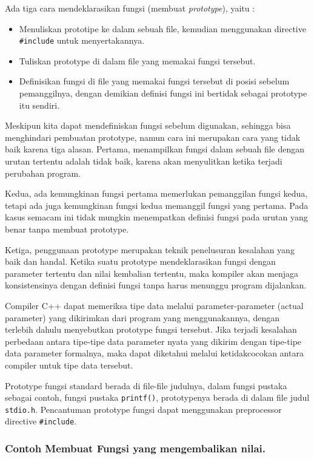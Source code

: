 Ada tiga cara mendeklarasikan fungsi (membuat \emph{prototype}), yaitu :

\begin{itemize}

\item
  Menuliskan prototipe ke dalam sebuah file, kemudian menggunakan
  directive \texttt{\#include} untuk menyertakannya.
\item
  Tuliskan prototype di dalam file yang memakai fungsi tersebut.
\item
  Definisikan fungsi di file yang memakai fungsi tersebut di posisi
  sebelum pemanggilnya, dengan demikian definisi fungsi ini bertidak
  sebagai prototype itu sendiri.
\end{itemize}

Meskipun kita dapat mendefiniskan fungsi sebelum digunakan, sehingga
bisa menghindari pembuatan prototype, namun cara ini merupakan cara yang
tidak baik karena tiga alasan. Pertama, menampilkan fungsi dalam sebuah
file dengan urutan tertentu adalah tidak baik, karena akan menyulitkan
ketika terjadi perubahan program.

Kedua, ada kemungkinan fungsi pertama memerlukan pemanggilan fungsi
kedua, tetapi ada juga kemungkinan fungsi kedua memanggil fungsi yang
pertama. Pada kasus semacam ini tidak mungkin menempatkan definisi
fungsi pada urutan yang benar tanpa membuat prototype.

Ketiga, penggunaan prototype merupakan teknik penelusuran kesalahan yang
baik dan handal. Ketika suatu prototype mendeklarasikan fungsi dengan
parameter tertentu dan nilai kembalian tertentu, maka kompiler akan
menjaga konsistensinya dengan definisi fungsi tanpa harus menunggu
program dijalankan.

Compiler C++ dapat memeriksa tipe data melalui parameter-parameter
(actual parameter) yang dikirimkan dari program yang menggunakannya,
dengan terlebih dahulu menyebutkan prototype fungsi tersebut. Jika
terjadi kesalahan perbedaan antara tipe-tipe data parameter nyata yang
dikirim dengan tipe-tipe data parameter formalnya, maka dapat diketahui
melalui ketidakcocokan antara compiler untuk tipe data tersebut.

Prototype fungsi standard berada di file-file judulnya, dalam fungsi
pustaka sebagai contoh, fungsi pustaka \texttt{printf()}, prototypenya
berada di dalam file judul \texttt{stdio.h}. Pencantuman prototype
fungsi dapat menggunakan preprocessor directive \texttt{\#include}.

\subsubsection*{Contoh  Membuat Fungsi yang mengembalikan nilai.}

